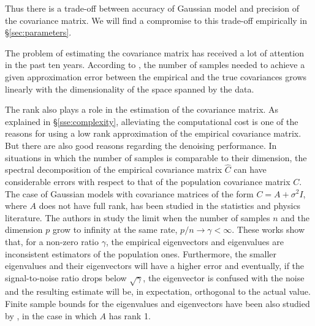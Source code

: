 \documentclass[10pt, journal, twocolumn, final, a4paper]{IEEEtran}
\newcommand{\pcomment}[1]{}
\begin{document}
Thus there is a trade-off between accuracy of Gaussian model and precision of the
covariance matrix. We will find a compromise to this trade-off empirically  in
\S \ref{sec:parameters}.


The problem of estimating the covariance matrix has received a lot of attention in the
past ten years.
According to \cite{Vershynin2012}, the number of samples needed to achieve a given approximation
error between the empirical and the true covariances grows linearly with the
dimensionality of the space spanned by the data. 

The rank also plays a role in the estimation of the covariance matrix.
As explained in \S \ref{sse:complexity}, alleviating the computational cost is
one of the reasons for using a low rank approximation of the empirical
covariance matrix. But there are also good reasons regarding the denoising
performance. In situations in which the number of samples 
is comparable to their dimension, the spectral decomposition of the empirical
covariance matrix $\widehat C$ can have considerable errors with respect to
that of the population covariance matrix $C$. 
%
The case of Gaussian models with covariance matrices of the form $C = A + \sigma^2I$,
where $A$ does not have full rank, has been studied in the statistics and physics
literature. The authors in \cite{johnstone2009,paul2007,nadler2008} study the
limit when the number of samples $n$ and the dimension $p$ grow to infinity at
the same rate, $p/n\to\gamma < \infty$.  These works show that, for a
non-zero ratio $\gamma$, the empirical eigenvectors 
and eigenvalues are inconsistent estimators of the population ones.
Furthermore, the smaller eigenvalues and their eigenvectors will have a higher
error and eventually, if the signal-to-noise ratio drops below $\sqrt{\gamma}$, 
the eigenvector is confused with the noise and the resulting estimate will be,
in expectation, orthogonal to the actual value.
Finite sample bounds for the eigenvalues and eigenvectors have been also studied 
by \cite{nadler2008}, in the case in which $A$ has rank 1.
\pcomment{What can we say about this bounds.}
\end{document}
